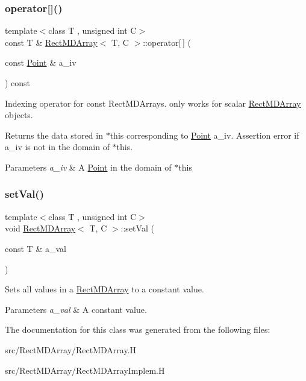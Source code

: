 \subsubsection{\texorpdfstring{operator[]()}{operator[]()}\hspace{0.1cm}{\footnotesize\ttfamily [2/2]}}
{\footnotesize\ttfamily template$<$class T , unsigned int C$>$ \\
const T \& \hyperlink{class_rect_m_d_array}{Rect\+M\+D\+Array}$<$ T, C $>$\+::operator\mbox{[}$\,$\mbox{]} (\begin{DoxyParamCaption}\item[{const \hyperlink{class_point}{Point} \&}]{a\+\_\+iv }\end{DoxyParamCaption}) const\hspace{0.3cm}{\ttfamily [inline]}}



Indexing operator for const Rect\+M\+D\+Arrays. only works for scalar \hyperlink{class_rect_m_d_array}{Rect\+M\+D\+Array} objects. 

Returns the data stored in $\ast$this corresponding to \hyperlink{class_point}{Point} a\+\_\+iv. Assertion error if a\+\_\+iv is not in the domain of $\ast$this. 
\begin{DoxyParams}{Parameters}
{\em a\+\_\+iv} & A \hyperlink{class_point}{Point} in the domain of $\ast$this \\
\hline
\end{DoxyParams}
\mbox{\label{class_rect_m_d_array_af84b04d2561605c230fef402b5df530e}} 
\subsubsection{\texorpdfstring{set\+Val()}{setVal()}}
{\footnotesize\ttfamily template$<$class T , unsigned int C$>$ \\
void \hyperlink{class_rect_m_d_array}{Rect\+M\+D\+Array}$<$ T, C $>$\+::set\+Val (\begin{DoxyParamCaption}\item[{const T \&}]{a\+\_\+val }\end{DoxyParamCaption})}



Sets all values in a \hyperlink{class_rect_m_d_array}{Rect\+M\+D\+Array} to a constant value. 


\begin{DoxyParams}{Parameters}
{\em a\+\_\+val} & A constant value. \\
\hline
\end{DoxyParams}


The documentation for this class was generated from the following files\+:\begin{DoxyCompactItemize}
\item 
src/\+Rect\+M\+D\+Array/Rect\+M\+D\+Array.\+H\item 
src/\+Rect\+M\+D\+Array/Rect\+M\+D\+Array\+Implem.\+H\end{DoxyCompactItemize}
